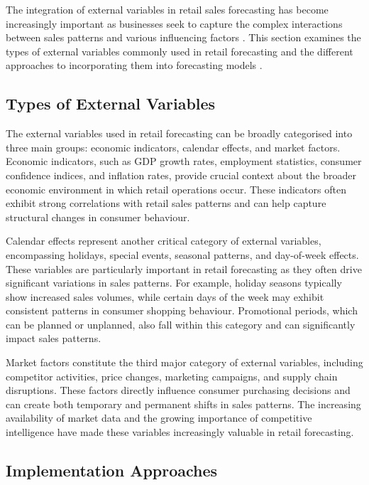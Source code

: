 \documentclass[12pt,a4paper]{report}
\begin{document}
The integration of external variables in retail sales forecasting has become increasingly important as businesses seek to capture the complex interactions between sales patterns and various influencing factors \citep{ons2023retail}. This section examines the types of external variables commonly used in retail forecasting and the different approaches to incorporating them into forecasting models \citep{samuelson2010economics}.

\subsection{Types of External Variables}

The external variables used in retail forecasting can be broadly categorised into three main groups: economic indicators, calendar effects, and market factors. Economic indicators, such as GDP growth rates, employment statistics, consumer confidence indices, and inflation rates, provide crucial context about the broader economic environment in which retail operations occur. These indicators often exhibit strong correlations with retail sales patterns and can help capture structural changes in consumer behaviour.

Calendar effects represent another critical category of external variables, encompassing holidays, special events, seasonal patterns, and day-of-week effects. These variables are particularly important in retail forecasting as they often drive significant variations in sales patterns. For example, holiday seasons typically show increased sales volumes, while certain days of the week may exhibit consistent patterns in consumer shopping behaviour. Promotional periods, which can be planned or unplanned, also fall within this category and can significantly impact sales patterns.

Market factors constitute the third major category of external variables, including competitor activities, price changes, marketing campaigns, and supply chain disruptions. These factors directly influence consumer purchasing decisions and can create both temporary and permanent shifts in sales patterns. The increasing availability of market data and the growing importance of competitive intelligence have made these variables increasingly valuable in retail forecasting.

\subsection{Implementation Approaches}
\end{document}
